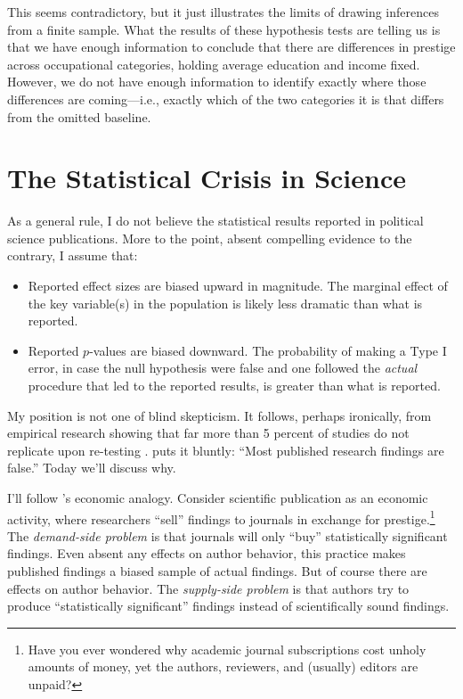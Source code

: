 \documentclass[
  12pt,
  oneside,openany]{book}
\begin{document}
This seems contradictory, but it just illustrates the limits of drawing inferences from a finite sample. What the results of these hypothesis tests are telling us is that we have enough information to conclude that there are differences in prestige across occupational categories, holding average education and income fixed. However, we do not have enough information to identify exactly where those differences are coming---i.e., exactly which of the two categories it is that differs from the omitted baseline.

\hypertarget{crisis}{%
\chapter{The Statistical Crisis in Science}\label{crisis}}

As a general rule, I do not believe the statistical results reported in political science publications. More to the point, absent compelling evidence to the contrary, I assume that:

\begin{itemize}
\item
  Reported effect sizes are biased upward in magnitude. The marginal effect of the key variable(s) in the population is likely less dramatic than what is reported.
\item
  Reported \(p\)-values are biased downward. The probability of making a Type I error, in case the null hypothesis were false and one followed the \emph{actual} procedure that led to the reported results, is greater than what is reported.
\end{itemize}

My position is not one of blind skepticism. It follows, perhaps ironically, from empirical research showing that far more than 5 percent of studies do not replicate upon re-testing \citep{open2015estimating}. \citet{ioannidis2005most} puts it bluntly: ``Most published research findings are false.'' Today we'll discuss why.

I'll follow \citet{young2008current}'s economic analogy. Consider scientific publication as an economic activity, where researchers ``sell'' findings to journals in exchange for prestige.\footnote{Have you ever wondered why academic journal subscriptions cost unholy amounts of money, yet the authors, reviewers, and (usually) editors are unpaid?} The \emph{demand-side problem} is that journals will only ``buy'' statistically significant findings. Even absent any effects on author behavior, this practice makes published findings a biased sample of actual findings. But of course there are effects on author behavior. The \emph{supply-side problem} is that authors try to produce ``statistically significant'' findings instead of scientifically sound findings.
\end{document}
